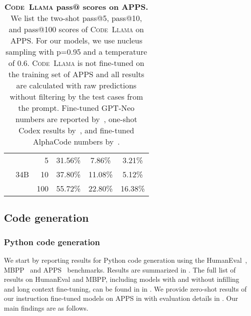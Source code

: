 \documentclass[10pt]{article}
\newcommand{\model}{\textsc{Code~Llama}\xspace}
\newcommand*{\acc}[1]{\num[round-mode=places,round-precision=1]{#1}\%}
\begin{document}
\begin{table}[t!]
\begin{tabular}{lrr|ccc}
    \cmidrule{2-6}
    & \multirow{3}{*}{34B} & 5     & \acc{31.56} & \acc{7.86} & \acc{3.21} \\
    &                      & 10    & \acc{37.80} & \acc{11.08} & \acc{5.12} \\
    &                      & 100   & \acc{55.72} & \acc{22.80} & \acc{16.38} \\
  \bottomrule
  \end{tabular}
  \caption{\textbf{\model pass@ scores on APPS.} We list the two-shot pass@5, pass@10, and pass@100 scores of \model on APPS. For our models, we use nucleus sampling with p=0.95 and a temperature of 0.6. \model is not fine-tuned on the training set of APPS and all results are calculated with raw predictions without filtering by the test cases from the prompt. Fine-tuned GPT-Neo numbers are reported by~\citet{hendrycks2021measuring}, one-shot Codex results by~\citet{chen2021evaluating}, and fine-tuned AlphaCode numbers by~\citet{li2022alphacode}. 
  \label{tab:apps_res}}
\end{table}

\subsection{Code generation}

\subsubsection{Python code generation}
\label{sec:python_evals}

We start by reporting results for Python code generation using the HumanEval~\citep{chen2021evaluating}, MBPP~\citep{austin2021program} and APPS~\citep{hendrycks2021measuring} benchmarks. Results are summarized in . The full list of results on HumanEval and MBPP, including models with and without infilling and long context fine-tuning, can be found in  in . We provide zero-shot results of our instruction fine-tuned models on APPS in  with evaluation details in . Our main findings are as follows.
\end{document}
